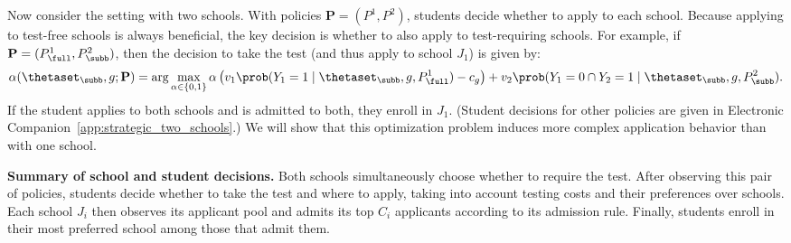 Now consider the setting with two schools. With policies $\mathbf{P} = (P^1, P^2)$, students decide whether to apply to each school. Because applying to test-free schools is always beneficial, the key decision is whether to also apply to test-requiring schools.
For example, if $\mathbf{P} = (P^1_{\full}, P^2_{\subb})$, then the decision to take the test (and thus apply to school $J_1$) is given by:
\small
\begin{equation*}
    \alpha(\thetaset_{\subb}, g; \mathbf{P}) = \arg \max_{\alpha \in \{0,1\}} \alpha \left( v_1 \prob (Y_1 = 1 \mid \thetaset_{\subb}, g, P^1_{\full})   - c_g  \right) + v_2 \prob (Y_1 = 0 \cap Y_2 =1 \mid \thetaset_{\subb}, g, {P}^2_{\subb}).
\end{equation*}
\normalsize
If the student applies to both schools and is admitted to both, they enroll in $J_1$. (Student decisions for other policies are given in Electronic Companion~\ref{app:strategic_two_schools}.)
We will show that this optimization problem induces more complex application behavior than with one school.


\smallskip
\noindent\textbf{Summary of school and student decisions.}
Both schools simultaneously choose whether to require the test. After observing this pair of policies, students decide whether to take the test and where to apply, taking into account testing costs and their preferences over schools. Each school $J_i$ then observes its applicant pool and admits its top $C_i$ applicants according to its admission rule.
Finally, students enroll in their most preferred school among those that admit them.



